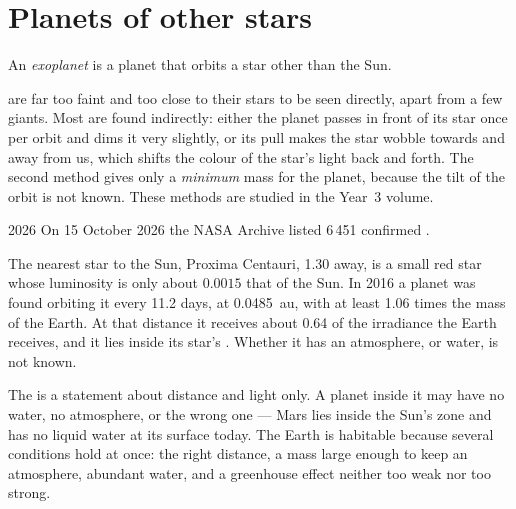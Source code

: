 \section{Planets of other stars}

\begin{definition}[Exoplanet]\label{def:g10:habitable-planet:exoplanet}
An \emph{exoplanet} is a planet that orbits a star other
than the Sun.
\end{definition}

 are far too faint and too close to their stars to be seen
directly, apart from a few giants. Most are found indirectly: either the
planet passes in front of its star once per orbit and dims it very slightly,
or its pull makes the star wobble towards and away from us, which shifts the
colour of the star's light back and forth. The second method gives only a
\emph{minimum} mass for the planet, because the tilt of the orbit is not
known. These methods are studied in the Year~3 volume.

\begin{dated}{2026}
On 15 October 2026 the NASA  Archive listed 6\,451 confirmed
.
\end{dated}

\begin{example}[Proxima b]\label{ex:g10:habitable-planet:proxima}
The nearest star to the Sun, Proxima Centauri, \qty{1.30}{\parsec} away, is a
small red star whose luminosity is only about $0.0015$ that of the Sun. In
2016 a planet was found orbiting it every 11.2 days, at \qty{0.0485}{au},
with at least 1.06 times the mass of the Earth. At that distance it receives
about 0.64 of the irradiance the Earth receives, and it lies inside its
star's . Whether it has an atmosphere, or water, is not known.
\end{example}

\begin{remark}\label{rem:g10:habitable-planet:inhabited}
The  is a statement about distance and light only. A planet
inside it may have no water, no atmosphere, or the wrong one --- Mars lies
inside the Sun's zone and has no liquid water at its surface today. The Earth
is habitable because several conditions hold at once: the right distance, a
mass large enough to keep an atmosphere, abundant water, and a greenhouse
effect neither too weak nor too strong.
\end{remark}

